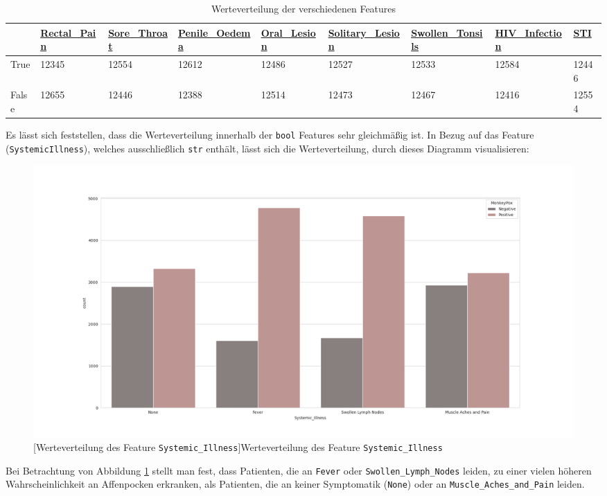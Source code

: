 \documentclass[13pt,a4paper, listof=entryprefix, bibliography=totocnumbered,toc=listofnumbered,lof=listofnumbered]{scrartcl}
\begin{document}
	\begin{singlespace}
	\begin{table}[H]
		\begin{adjustbox}{width=1\textwidth}
			\small
		\begin{tabular}{|l|l|l|l|l|l|l|l|l|}
			\hline  & \url{Rectal_Pain}&  \url{Sore_Throat}	& \url{Penile_Oedema} & \url{Oral_Lesion} & \url{Solitary_Lesion} &\url{Swollen_Tonsils} & \url{HIV_Infection} & \url{STI} \\
			\hline True & 12345 & 12554 & 12612 & 12486 & 12527 & 12533 & 12584  & 12446 \\
			\hline False & 12655 & 12446 & 12388& 12514 & 12473 & 12467 & 12416 & 12554\\
			\hline
		\end{tabular}
	\end{adjustbox}
		\caption{Werteverteilung der verschiedenen Features} %
		\label{tab:werteverteilung_features}
	\end{table}
\end{singlespace}
	

	Es lässt sich feststellen, dass die Werteverteilung innerhalb der \lstinline{bool} Features sehr gleichmäßig ist. 
	In Bezug auf das Feature (\lstinline{SystemicIllness}), welches ausschließlich \lstinline{str} enthält,  lässt sich die 
	Werteverteilung, durch dieses Diagramm visualisieren: 

	\begin{figure}[H]
		\centering
		\includegraphics[width=0.8\linewidth]{Bilder/systemic_illness_plot.png}
		[Werteverteilung des Feature \lstinline{Systemic_Illness}]{Werteverteilung des Feature \lstinline{Systemic_Illness}}
		\label{fig:systemic_illness_plot}
	\end{figure}

	Bei Betrachtung von Abbildung \ref{fig:systemic_illness_plot} stellt man fest, dass Patienten, die an \lstinline{Fever} oder \lstinline{Swollen_Lymph_Nodes} leiden, zu einer
	vielen höheren Wahrscheinlichkeit an Affenpocken erkranken, als Patienten, die an keiner Symptomatik (\lstinline{None}) oder an \lstinline{Muscle_Aches_and_Pain} leiden.
\end{document}
